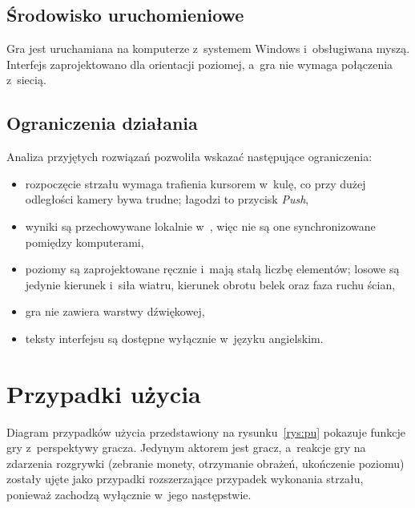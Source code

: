 \subsection{Środowisko uruchomieniowe}

Gra jest uruchamiana na komputerze z~systemem Windows i~obsługiwana myszą. Interfejs
zaprojektowano dla orientacji poziomej, a~gra nie wymaga połączenia z~siecią.

\subsection{Ograniczenia działania}

Analiza przyjętych rozwiązań pozwoliła wskazać następujące ograniczenia:
\begin{itemize}[leftmargin=1.9cm, itemsep=1pt]
  \item rozpoczęcie strzału wymaga trafienia kursorem w~kulę, co przy dużej odległości
        kamery bywa trudne; łagodzi to przycisk \emph{Push},
  \item wyniki są przechowywane lokalnie w~, więc nie są one
        synchronizowane pomiędzy komputerami,
  \item poziomy są zaprojektowane ręcznie i~mają stałą liczbę elementów; losowe są jedynie
        kierunek i~siła wiatru, kierunek obrotu belek oraz faza ruchu ścian,
  \item gra nie zawiera warstwy dźwiękowej,
  \item teksty interfejsu są dostępne wyłącznie w~języku angielskim.
\end{itemize}

\section{Przypadki użycia}

Diagram przypadków użycia przedstawiony na rysunku~\ref{rys:pu} pokazuje funkcje gry
z~perspektywy gracza. Jedynym aktorem jest gracz, a~reakcje gry na zdarzenia rozgrywki
(zebranie monety, otrzymanie obrażeń, ukończenie poziomu) zostały ujęte jako przypadki
rozszerzające przypadek wykonania strzału, ponieważ zachodzą wyłącznie w~jego następstwie.

